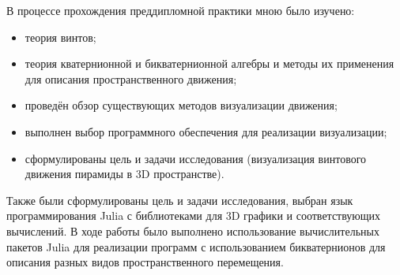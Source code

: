 В процессе прохождения преддипломной практики мною было изучено:
\begin{itemize}
    \item теория винтов;
    \item теория кватернионной и бикватернионной алгебры и методы их применения для описания пространственного движения;
    \item проведён обзор существующих методов визуализации движения;
    \item выполнен выбор программного обеспечения для реализации визуализации;
    \item сформулированы цель и задачи исследования (визуализация винтового движения пирамиды в 3D пространстве).
\end{itemize}

Также были сформулированы цель и задачи исследования, выбран язык программирования Julia с библиотеками для 3D графики и соответствующих вычислений. В ходе работы было выполнено использование вычислительных пакетов Julia для реализации программ с использованием бикватернионов для описания разных видов пространственного перемещения.


